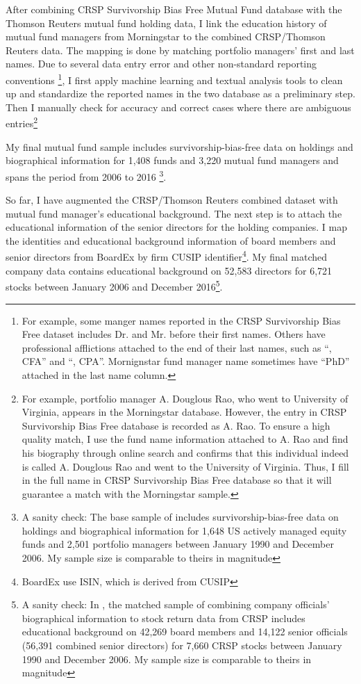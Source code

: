 \documentclass[11pt]{article}
\begin{document}
\begin{doublespace}
After combining CRSP Survivorship Bias Free Mutual Fund database with the Thomson Reuters mutual fund holding data, I link the education history of mutual fund managers from Morningstar to the combined CRSP/Thomson Reuters data. The mapping is done by matching portfolio managers' first and last names. Due to several data entry error and other non-standard reporting conventions \footnote{For example, some manger names reported in the CRSP Survivorship Bias Free dataset includes Dr. and Mr. before their first names. Others have professional afflictions attached to the end of their last names, such as ``, CFA'' and ``, CPA''. Mornignstar fund manager name sometimes have ``PhD'' attached in the last name column.}, I first apply machine learning and textual analysis tools to clean up and standardize the reported names in the two database as a preliminary step. Then I manually check for accuracy and correct cases where there are ambiguous entries\footnote{For example, portfolio manager A. Douglous Rao, who went to University of Virginia, appears in the Morningstar database. However, the entry in CRSP Survivorship Bias Free database is recorded as A. Rao. To ensure a high quality match, I use the fund name information attached to A. Rao and find his biography through online search and confirms that this individual indeed is called A. Douglous Rao and went to the University of Virginia. Thus, I fill in the full name in CRSP Survivorship Bias Free database so that it will guarantee a match with the Morningstar sample.}

 My final mutual fund sample includes survivorship-bias-free data on holdings and biographical information for 1,408 funds and 3,220 mutual fund managers and spans the period from 2006 to 2016 \footnote{A sanity check: The base sample of \cite{cohen2008small} includes survivorship-bias-free data on holdings and biographical information for 1,648 US actively managed equity funds and 2,501 portfolio managers between January 1990 and December 2006. My sample size is comparable to theirs in magnitude}.

So far, I have augmented the CRSP/Thomson Reuters combined dataset with mutual fund manager's educational background. The next step is to attach the educational information of the senior directors for the holding companies. I map the identities and educational background information of board members and senior directors from BoardEx by firm CUSIP identifier\footnote{BoardEx use ISIN, which is derived from CUSIP}. My final matched company data contains educational background on 52,583 directors for 6,721 stocks between January 2006 and December 2016\footnote{A sanity check: In \cite{cohen2008small}, the matched sample of combining company officials' biographical information to stock return data from CRSP includes educational background on 42,269 board members and 14,122 senior officials (56,391 combined senior directors) for 7,660 CRSP stocks between January 1990 and December 2006. My sample size is comparable to theirs in magnitude}.


\end{doublespace}
\end{document}
